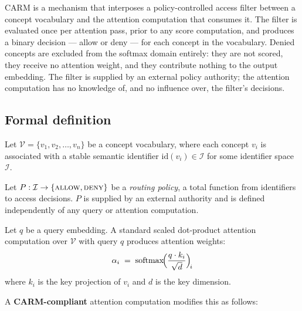 \documentclass[11pt,a4paper]{article}
\theoremstyle{definition}
\newcommand{\ALLOW}{\mbox{\textsc{allow}}}
\newcommand{\DENY}{\mbox{\textsc{deny}}}
\newcommand{\vocab}{\mathcal{V}}
\newcommand{\idset}{\mathcal{I}}
\newcommand{\policy}{P}
\begin{document}
CARM is a mechanism that interposes a policy-controlled access filter between a
concept vocabulary and the attention computation that consumes it. The filter is
evaluated once per attention pass, prior to any score computation, and produces a
binary decision --- allow or deny --- for each concept in the vocabulary. Denied
concepts are excluded from the softmax domain entirely: they are not scored, they
receive no attention weight, and they contribute nothing to the output embedding.
The filter is supplied by an external policy authority; the attention computation has
no knowledge of, and no influence over, the filter's decisions.

\subsection{Formal definition}
\label{sec:formal}

Let $\vocab = \{v_1, v_2, \ldots, v_n\}$ be a concept vocabulary, where each
concept $v_i$ is associated with a stable semantic identifier
$\mathrm{id}(v_i) \in \idset$ for some identifier space $\idset$.

Let $\policy : \idset \to \{\ALLOW, \DENY\}$ be a \emph{routing policy}, a total
function from identifiers to access decisions. $\policy$ is supplied by an external
authority and is defined independently of any query or attention computation.

Let $q$ be a query embedding. A standard scaled dot-product attention computation
over $\vocab$ with query $q$ produces attention weights:
\[
  \alpha_i \;=\; \operatorname{softmax}\!\Bigl(
    \frac{q \cdot k_i}{\sqrt{d}}
  \Bigr)_{\!i}
\]
where $k_i$ is the key projection of $v_i$ and $d$ is the key dimension.

A \textbf{CARM-compliant} attention computation modifies this as follows:
\end{document}
